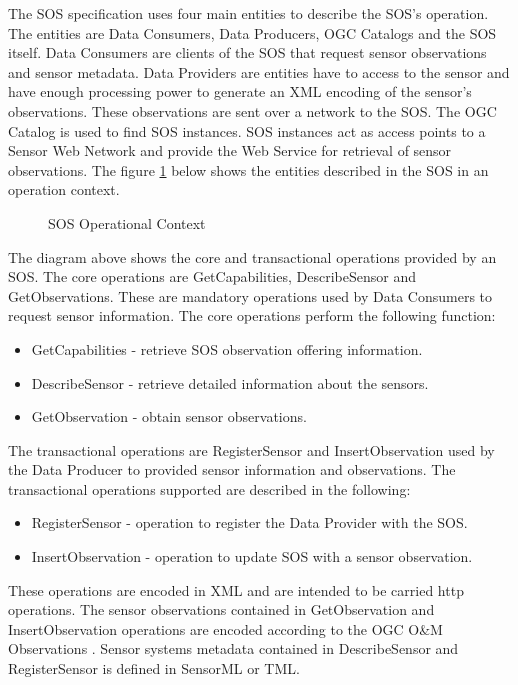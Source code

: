 \documentclass[]{final_report}
\begin{document}
The SOS specification uses four main entities to describe the SOS's operation. The entities are Data Consumers, Data Producers, OGC Catalogs and the SOS itself. Data Consumers are clients of the SOS that request sensor observations and sensor metadata. Data Providers are entities have to access to the sensor and have enough processing power to generate an XML encoding of the sensor's observations. These observations are sent over a network to the SOS. The OGC Catalog is used to find SOS instances. SOS instances act as access points to a Sensor Web Network and provide the Web Service for retrieval of sensor observations. The figure \ref{fig:SOSoperationContext} below shows the entities described in the SOS in an operation context.
\begin{figure}[h]
\caption{SOS Operational Context}\label{fig:SOSoperationContext}
\end{figure}

The diagram above shows the core and transactional operations provided by an SOS. The core operations are GetCapabilities, DescribeSensor and GetObservations. These are mandatory operations used by Data Consumers to request sensor information.  The core operations perform the following function:
 \begin{itemize}
\item GetCapabilities  -    retrieve SOS observation offering information.
\item DescribeSensor -    retrieve detailed information about the sensors.
\item GetObservation -   obtain sensor observations.
\end{itemize}

The transactional operations are RegisterSensor and InsertObservation used by the Data Producer to provided sensor information and observations. The transactional operations supported are described in the following:
 \begin{itemize}
\item RegisterSensor - operation to register the Data Provider with the SOS.
\item InsertObservation - operation to update SOS with a sensor observation.
\end{itemize}

These operations are encoded in XML and are intended to be carried http  operations. The sensor observations contained in  GetObservation and InsertObservation operations are encoded according to the OGC O\&M Observations \cite{OMref}. Sensor systems metadata contained in DescribeSensor and RegisterSensor is defined in SensorML or TML.
\end{document}
